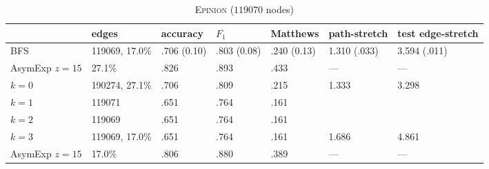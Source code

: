 \documentclass[a4paper,final,notitlepage,11pt,svgnames]{scrartcl}
\begin{document}
\begin{table}[htpb]
	\centering
	\caption{\textsc{Epinion} ($119070$ nodes) \label{tab:epinion}}
	\begin{tabular}{lllllll}
		\toprule
						& edges          & accuracy    & $F_1$       & Matthews    & path-stretch & test edge-stretch \\
		 \midrule
		 BFS            & 119069, 17.0\% & .706 (0.10) & .803 (0.08) & .240 (0.13) & 1.310 (.033) & 3.594 (.011)\\
		 AsymExp $z=15$ & 27.1\%         & .826        & .893        & .433        & ---          & --- \\
		 $k=0$          & 190274, 27.1\% & .706        & .809        & .215        & 1.333        & 3.298\\
		 $k=1$          & 119071         & .651        & .764        & .161        &              & \\
		 $k=2$          & 119069         & .651        & .764        & .161        &              & \\
		 $k=3$          & 119069, 17.0\% & .651        & .764        & .161        & 1.686        & 4.861\\
		 AsymExp $z=15$ & 17.0\%         & .806        & .880        & .389        & ---          & --- \\
		\bottomrule
	\end{tabular}
\end{table}

\end{document}
